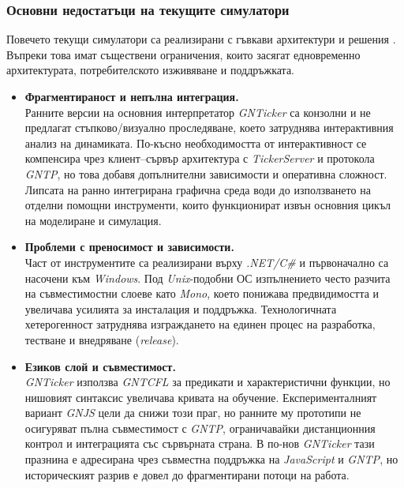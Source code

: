 \subsubsection{Основни недостатъци на текущите симулатори}

\hspace*{2.5em}Повечето текущи симулатори са реализирани с гъвкави архитектури и решения \cite{Dimitrov2010SoftwareGN}. Въпреки това имат съществени ограничения, които засягат едновременно архитектурата, потребителското изживяване и поддръжката.

\begin{itemize}
    \item \textbf{Фрагментираност и непълна интеграция.} \\
    Ранните версии на основния интерпретатор \textit{GNTicker} са конзолни и не предлагат стъпково/визуално проследяване, което затруднява интерактивния анализ на динамиката. По-късно необходимостта от интерактивност се компенсира чрез клиент--сървър архитектура с \textit{TickerServer} и протокола \textit{GNTP}, но това добавя допълнителни зависимости и оперативна сложност. Липсата на ранно интегрирана графична среда води до използването на отделни помощни инструменти, които функционират извън основния цикъл на моделиране и симулация.

    \item \textbf{Проблеми с преносимост и зависимости.} \\
    Част от инструментите са реализирани върху \textit{.NET/C\#} и първоначално са насочени към \textit{Windows}. Под \textit{Unix}-подобни ОС изпълнението често разчита на съвместимостни слоеве като \textit{Mono}, което понижава предвидимостта и увеличава усилията за инсталация и поддръжка. Технологичната хетерогенност затруднява изграждането на единен процес на разработка, тестване и внедряване (\textit{release}).

    \item \textbf{Езиков слой и съвместимост.} \\
    \textit{GNTicker} използва \textit{GNTCFL} за предикати и характеристични функции, но нишовият синтаксис увеличава кривата на обучение. Експерименталният вариант \textit{GNJS} цели да снижи този праг, но ранните му прототипи не осигуряват пълна съвместимост с \textit{GNTP}, ограничавайки дистанционния контрол и интеграцията със сървърната страна. В по-нов \textit{GNTicker} тази празнина е адресирана чрез съвместна поддръжка на \textit{JavaScript} и \textit{GNTP}, но историческият разрив е довел до фрагментирани потоци на работа.


\end{itemize}
